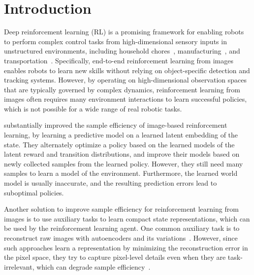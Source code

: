 \documentclass[a4paper,12pt]{article}
\begin{document}




\section{Introduction}
Deep reinforcement learning (RL) is a promising framework for enabling robots to perform complex control tasks from high-dimensional sensory inputs in unstructured environments, including household chores~\cite{levine2016end}, manufacturing~\cite{li2019robot}, and transportation~\cite{zhu2017target}. Specifically, end-to-end reinforcement learning from images enables robots to learn new skills without relying on object-specific detection and tracking systems. However, by operating on high-dimensional observation spaces that are typically governed by complex dynamics, reinforcement learning from images often requires many environment interactions to learn successful policies, which is not possible for a wide range of real robotic tasks.

\citet{hafner2020Dream, hafner2019learning} substantially improved the sample efficiency of image-based reinforcement learning, by learning a predictive model on a learned latent embedding of the state. They alternately optimize a policy based on the learned models of the latent reward and transition distributions, and improve their models based on newly collected samples from the learned policy. However, they still need many samples to learn a model of the environment. Furthermore, the learned world model is usually inaccurate, and the resulting prediction errors lead to suboptimal policies. 

Another solution to improve sample efficiency for reinforcement learning from images is to use auxiliary tasks to learn compact state representations, which can be used by the reinforcement learning agent. One common auxiliary task is to reconstruct raw images with autoencoders and its variations~\cite{mattner2012learn, watter2015embed, yarats2019improving}. However, since such approaches learn a representation by minimizing the reconstruction error in the pixel space, they try to capture pixel-level details even when they are task-irrelevant, which can degrade sample efficiency~\cite{zhang2020learning}. 
\end{document}
